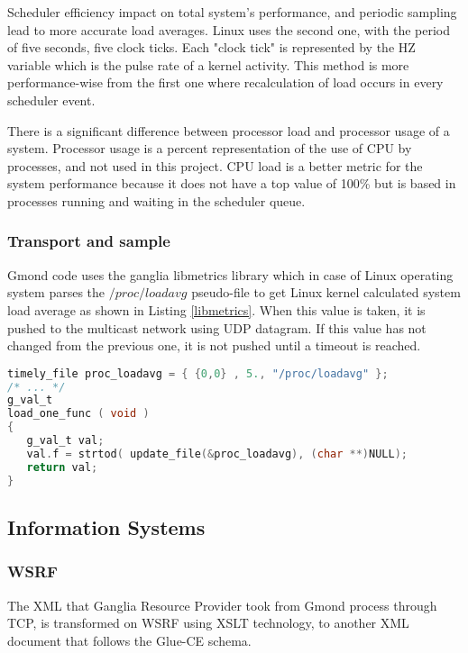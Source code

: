 Scheduler efficiency impact on total system's performance, and periodic sampling lead to more accurate load averages. Linux uses the second one, with the period of five seconds, five clock ticks. Each "clock tick" is represented by the HZ variable which is the pulse rate of a kernel activity. This method is more performance-wise from the first one where recalculation of load occurs in every scheduler event. 

There is a significant difference between processor load and processor usage of a system. Processor usage is a percent representation of the use of CPU by processes, and not used in this project. CPU load is a better metric for the system performance because it does not have a top value of 100\% but is based in processes running and waiting in the scheduler queue.

\subsubsection{Transport and sample}
Gmond code uses the ganglia libmetrics library which in case of Linux operating system parses the $/proc/loadavg$ pseudo-file to get Linux kernel calculated system load average as shown in Listing \ref{libmetrics}. When this value is taken, it is pushed to the multicast network using UDP datagram. If this value has not changed from the previous one, it is not pushed until a timeout is reached.

\begin{lstlisting}[language=C,caption=libmetrics code to get load average,label=libmetrics]
timely_file proc_loadavg = { {0,0} , 5., "/proc/loadavg" };
/* ... */
g_val_t
load_one_func ( void )
{
   g_val_t val;
   val.f = strtod( update_file(&proc_loadavg), (char **)NULL);
   return val;
}
\end{lstlisting}

\subsection{Information Systems}

\subsubsection{WSRF}

The XML that Ganglia Resource Provider took from Gmond process through TCP, is transformed on WSRF using XSLT technology, to another XML document that follows the Glue-CE schema.

